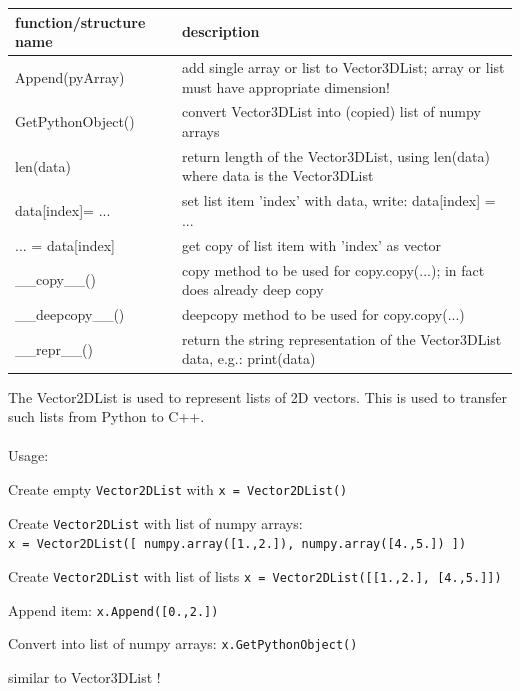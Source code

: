 \begin{center}
\footnotesize
\begin{longtable}{| p{8cm} | p{8cm} |} 
\hline
{\bf function/structure name} & {\bf description}\\ \hline
  Append(pyArray) & add single array or list to Vector3DList; array or list must have appropriate dimension!\\ \hline 
  GetPythonObject() & convert Vector3DList into (copied) list of numpy arrays\\ \hline 
  len(data) & return length of the Vector3DList, using len(data) where data is the Vector3DList\\ \hline 
  data[index]= ... & set list item 'index' with data, write: data[index] = ...\\ \hline 
  ... = data[index] & get copy of list item with 'index' as vector\\ \hline 
  \_\_copy\_\_() & copy method to be used for copy.copy(...); in fact does already deep copy\\ \hline 
  \_\_deepcopy\_\_() & deepcopy method to be used for copy.copy(...)\\ \hline 
  \_\_repr\_\_() & return the string representation of the Vector3DList data, e.g.: print(data)\\ \hline 
\end{longtable}
\end{center}

The Vector2DList is used to represent lists of 2D vectors. This is used to transfer such lists from Python to C++. \\ \\ Usage: \bi
  \item Create empty \texttt{Vector2DList} with \texttt{x = Vector2DList()} 
  \item Create \texttt{Vector2DList} with list of numpy arrays:\\\texttt{x = Vector2DList([ numpy.array([1.,2.]), numpy.array([4.,5.]) ])}
  \item Create \texttt{Vector2DList} with list of lists \texttt{x = Vector2DList([[1.,2.], [4.,5.]])}
  \item Append item: \texttt{x.Append([0.,2.])}
  \item Convert into list of numpy arrays: \texttt{x.GetPythonObject()}
  \item similar to Vector3DList !
\ei


